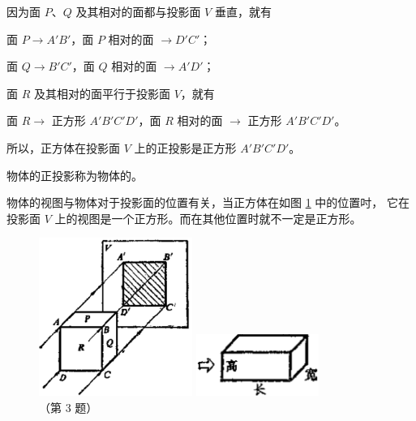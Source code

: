因为面 $P$、$Q$ 及其相对的面都与投影面 $V$ 垂直，就有

面 $P \to A'B'$，面 $P$ 相对的面 $\to D'C'$；

面 $Q \to B'C'$，面 $Q$ 相对的面 $\to A'D'$；

面 $R$ 及其相对的面平行于投影面 $V$，就有

面 $R \to$ 正方形 $A'B'C'D'$，面 $R$ 相对的面 $\to$ 正方形 $A'B'C'D'$。

所以，正方体在投影面 $V$ 上的正投影是正方形 $A'B'C'D'$。

物体的正投影称为物体的。

物体的视图与物体对于投影面的位置有关，当正方体在如图 \ref{fig:czjh2-8-6} 中的位置吋，
它在投影面 $V$ 上的视图是一个正方形。而在其他位置时就不一定是正方形。


\begin{figure}[htbp]
    \centering
    \begin{minipage}[b]{7cm}
        \centering
        \includegraphics[width=5cm]{../pic/czjh2-ch8-06.png}
        \caption{}\label{fig:czjh2-8-6}
    \end{minipage}
    \begin{minipage}[b]{7cm}
        \centering
        \includegraphics[width=4cm]{../pic/czjh2-ch8-subsec1-lx-03.png}
        \caption*{（第 3 题）}
    \end{minipage}
\end{figure}


\begin{lianxi}




\end{lianxi}


